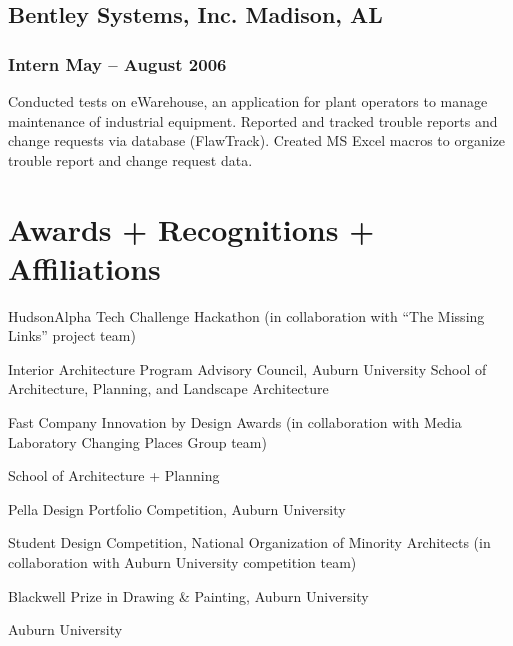 \documentclass[letterpaper, oneside, 10pt]{article}
\begin{document}
\subsection*{Bentley Systems, Inc.\DotSep{0.25em} Madison, AL}

\subsubsection*{Intern\DotSep{0.25em} May -- August 2006}

Conducted tests on eWarehouse, an application for plant operators to manage
maintenance of industrial equipment. Reported and tracked trouble reports and
change requests via database (FlawTrack). Created MS Excel macros to organize
trouble report and change request data.

\suppresstrue


\section*{Awards + Recognitions + Affiliations} %

\DotSep{0.25em}
HudsonAlpha Tech Challenge Hackathon (in collaboration with ``The Missing
Links'' project team)

\DotSep{0.25em} Interior Architecture
Program Advisory Council, Auburn University School of Architecture, Planning,
and Landscape Architecture  

\DotSep{0.25em} Fast Company Innovation
by Design Awards (in collaboration with  Media Laboratory Changing
Places Group team)

\DotSep{0.25em}  School of
Architecture + Planning 

\DotSep{0.25em} Pella Design Portfolio
Competition, Auburn University 

\DotSep{0.25em} Student Design Competition,
National Organization of Minority Architects (in collaboration with Auburn
University  competition team)

\DotSep{0.25em} Blackwell Prize in Drawing \&
Painting, Auburn University 

\DotSep{0.25em} Auburn University 
\end{document}
